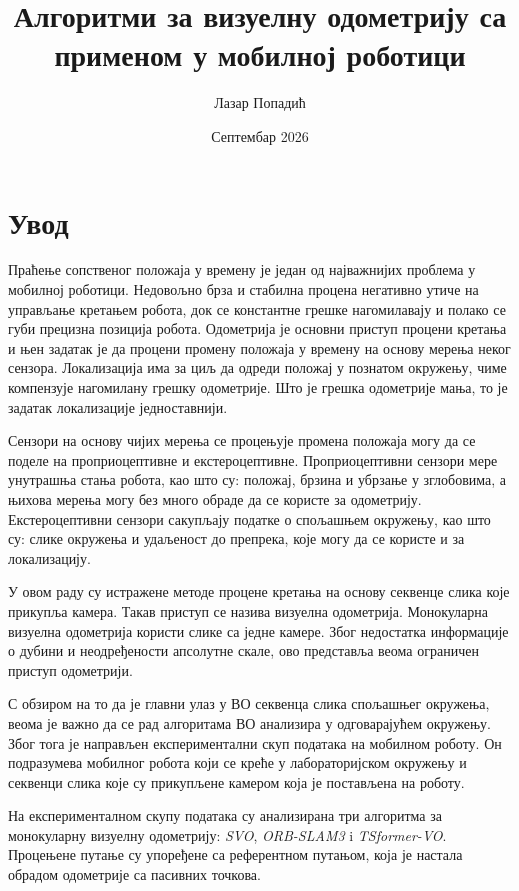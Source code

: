\documentclass[12pt]{article}
\title{Алгоритми за визуелну одометрију са применом у мобилној роботици}
\author{Лазар Попадић}
\date{Септембар 2026}
\begin{document}
\tableofcontents
\newpage

\listoffigures
{}

\listoftables
{}

\newpage
\section{Увод}

Праћење сопственог положаја у времену је један од најважнијих проблема у
мобилној роботици. Недовољно брза и стабилна процена негативно утиче на
управљање кретањем робота, док се константне грешке нагомилавају и полако се
губи прецизна позиција робота. Одометрија је основни приступ процени кретања и
њен задатак је да процени промену положаја у времену на основу мерења неког
сензора. Локализација има за циљ да одреди положај у познатом окружењу, чиме
компензује нагомилану грешку одометрије. Што је грешка одометрије мања, то је
задатак локализације једноставнији.

Сензори на основу чијих мерења се процењује промена положаја могу да се поделе
на проприоцептивне и екстероцептивне. Проприоцептивни сензори мере унутрашња
стања робота, као што су: положај, брзина и убрзање у зглобовима, а њихова
мерења могу без много обраде да се користе за одометрију. Екстероцептивни
сензори сакупљају податке о спољашњем окружењу, као што су: слике окружења и
удаљеност до препрека, које могу да се користе и за локализацију.

У овом раду су истражене методе процене кретања на основу секвенце слика које
прикупља камера. Такав приступ се назива визуелна одометрија. Монокуларна
визуелна одометрија користи слике са једне камере. Због недостатка информације
о дубини и неодређености апсолутне скале, ово представља веома ограничен
приступ одометрији.

С обзиром на то да је главни улаз у ВО секвенца слика спољашњег окружења, веома
је важно да се рад алгоритама ВО анализира у одговарајућем окружењу. Због тога
је направљен експериментални скуп података на мобилном роботу. Он подразумева
мобилног робота који се креће у лабораторијском окружењу и секвенци слика које
су прикупљене камером која је постављена на роботу.

На експерименталном скупу података су анализирана три алгоритма за монокуларну
визуелну одометрију: \textit{SVO}, \textit{ORB-SLAM3} i \textit{TSformer-VO}.
Процењене путање су упоређене са референтном путањом, која је настала обрадом
одометрије са пасивних точкова.
\end{document}
